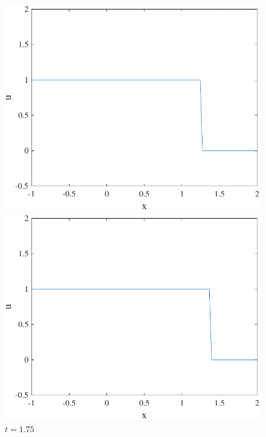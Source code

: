 \documentclass{article}
\begin{document}
\begin{figure}[H]
\begin{minipage}[b]{0.49\textwidth}
  \end{minipage}
    \hfill
  \begin{minipage}[b]{0.49\textwidth}
    \includegraphics[width=\textwidth]{hw_14_plot11.pdf}
    \caption{$t = 1.5$}

  \end{minipage}
      \hfill
  \begin{minipage}[b]{0.49\textwidth}
    \includegraphics[width=\textwidth]{hw_14_plot12.pdf}
    \caption{$t = 1.75$}

  \end{minipage}
\end{figure}
\end{document}
